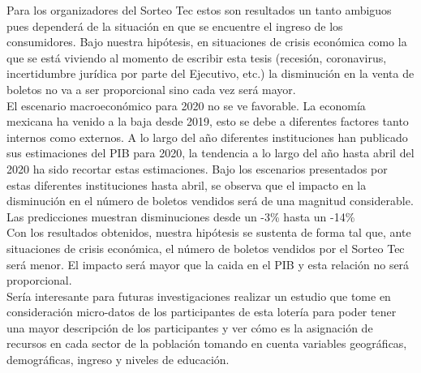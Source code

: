 Para los organizadores del Sorteo Tec estos son resultados un tanto ambiguos pues dependerá de la situación en que se encuentre el ingreso de los consumidores. Bajo nuestra hipótesis, en situaciones de crisis económica como la que se está viviendo al momento de escribir esta tesis (recesión, coronavirus, incertidumbre jurídica por parte del Ejecutivo, etc.) la disminución en la venta de boletos no va a ser proporcional sino cada vez será mayor. \\

El escenario macroeconómico para 2020 no se ve favorable. La economía mexicana ha venido a la baja desde 2019, esto se debe a diferentes factores tanto internos como externos. A lo largo del año diferentes instituciones han publicado sus estimaciones del PIB para 2020, la tendencia a lo largo del año hasta abril del 2020 ha sido recortar estas estimaciones. Bajo los escenarios presentados por estas diferentes instituciones hasta abril, se observa que el impacto en la disminución en el número de boletos vendidos será de una magnitud considerable. Las predicciones muestran disminuciones desde un -3\% hasta un -14\% \\

Con los resultados obtenidos, nuestra hipótesis se sustenta de forma tal que, ante situaciones de crisis económica, el número de boletos vendidos por el Sorteo Tec será menor. El impacto será mayor que la caida en el PIB y esta relación no será proporcional. \\




Sería interesante para futuras investigaciones realizar un estudio que tome en consideración micro-datos de los participantes de esta lotería para poder tener una mayor descripción de los participantes y ver cómo es la asignación de recursos en cada sector de la población tomando en cuenta variables geográficas, demográficas, ingreso y niveles de educación.

